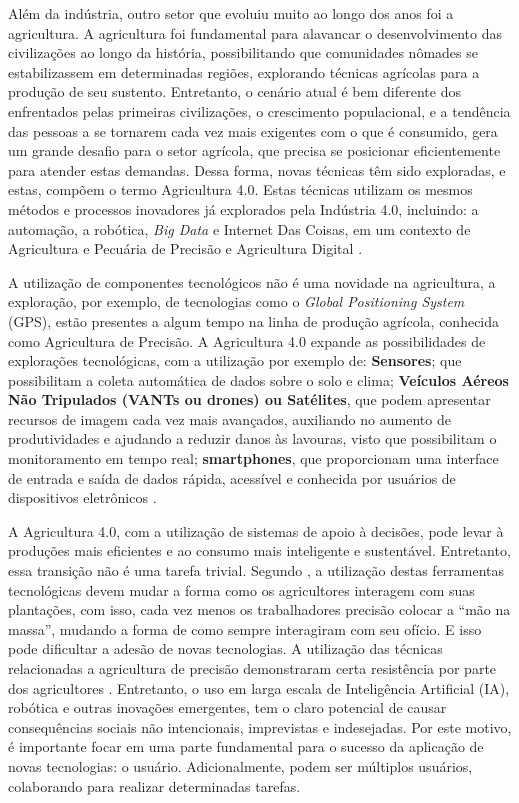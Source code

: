 Além da indústria, outro setor que evoluiu muito ao longo dos anos foi a agricultura. A agricultura foi fundamental para alavancar o desenvolvimento das civilizações ao longo da história, possibilitando que comunidades nômades se estabilizassem em determinadas regiões, explorando técnicas agrícolas para a produção de seu sustento. Entretanto, o cenário atual é bem diferente dos enfrentados pelas primeiras civilizações, o crescimento populacional, e a tendência das pessoas a se tornarem cada vez mais exigentes com o que é consumido, gera um grande desafio para o setor agrícola, que precisa se posicionar eficientemente para atender estas demandas. Dessa forma, novas técnicas têm sido exploradas, e estas, compõem o termo Agricultura 4.0. Estas técnicas utilizam os mesmos métodos e processos inovadores já explorados pela Indústria 4.0, incluindo: a automação, a robótica, \textit{Big Data} e Internet Das Coisas, em um contexto de Agricultura e Pecuária de Precisão e Agricultura Digital \cite{Ribeiro:2018}.

A utilização de componentes tecnológicos não é uma novidade na agricultura, a exploração, por exemplo, de tecnologias como o \textit{Global Positioning System} (GPS), estão presentes a algum tempo na linha de produção agrícola, conhecida como Agricultura de Precisão. A Agricultura 4.0 expande as possibilidades de explorações tecnológicas, com a utilização por exemplo de: \textbf{Sensores}; que possibilitam a coleta automática de dados sobre o solo e clima; \textbf{Veículos Aéreos Não Tripulados (VANTs ou drones) ou Satélites}, que podem apresentar recursos de imagem cada vez mais avançados, auxiliando no aumento de produtividades e ajudando a reduzir danos às lavouras, visto que possibilitam o monitoramento em tempo real; \textbf{smartphones}, que proporcionam uma interface de entrada e saída de dados rápida, acessível e conhecida por usuários de dispositivos eletrônicos \cite{Shepherd:2018}.

A Agricultura 4.0, com a utilização de sistemas de apoio à decisões, pode levar à produções mais eficientes e ao consumo mais inteligente e sustentável. Entretanto, essa transição não é uma tarefa trivial. Segundo , a utilização destas ferramentas tecnológicas devem mudar a forma como os agricultores interagem com suas plantações, com isso, cada vez menos os trabalhadores precisão colocar a ``mão na massa'', mudando a forma de como sempre interagiram com seu ofício. E isso pode dificultar a adesão de novas tecnologias. A utilização das técnicas relacionadas a agricultura de precisão demonstraram certa resistência por parte dos agricultores \cite{Rose:2019}. Entretanto, o uso em larga escala de Inteligência Artificial (IA), robótica e outras inovações emergentes, tem o claro potencial de causar consequências sociais não intencionais, imprevistas e indesejadas. Por este motivo, é importante focar em uma parte fundamental para o sucesso da aplicação de novas tecnologias: o usuário. Adicionalmente, podem ser múltiplos usuários, colaborando para realizar determinadas tarefas.

